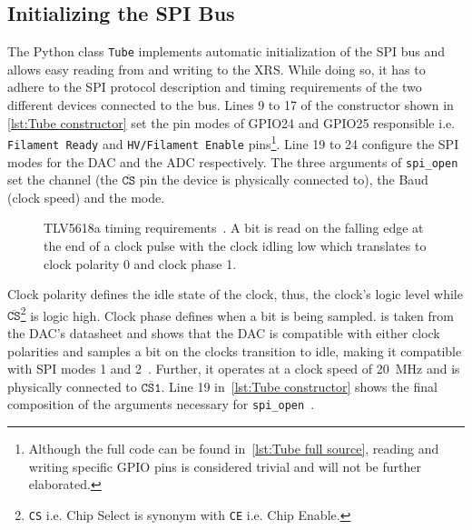         \subsection{Initializing the SPI Bus}\label{sec:init spi bus}
            The Python class \texttt{Tube} implements automatic initialization of the SPI bus and allows easy reading from and writing to the XRS.
            While doing so, it has to adhere to the SPI protocol description and timing requirements of the two different devices connected to the bus.
            Lines 9 to 17 of the constructor shown in \cref{lst:Tube constructor} set the pin modes of GPIO24 and GPIO25 responsible i.e. \texttt{Filament Ready} and \texttt{HV/Filament Enable} pins\footnote{Although the full code can be found in~\cref{lst:Tube full source}, reading and writing specific GPIO pins is considered trivial and will not be further elaborated.}.
            Line 19 to 24 configure the SPI modes for the DAC and the ADC respectively.
            The three arguments of \texttt{spi\_open} set the channel (the \(\overline{\texttt{CS}}\) pin the device is physically connected to), the Baud (clock speed) and the mode.

            \begin{figure}[h]
                \centering
                
                \caption[TLV5618a timing requirements]{TLV5618a timing requirements~\cite{Manual.DAC.TLV5618A}. A bit is read on the falling edge at the end of a clock pulse with the clock idling low which translates to clock polarity 0 and clock phase 1.}
                \label{fig:tlv5618a timing req}
            \end{figure}\par\medskip

            Clock polarity defines the idle state of the clock, thus, the clock's logic level while \(\overline{\texttt{CS}}\)\footnote{\texttt{CS} i.e. Chip Select is synonym with \texttt{CE} i.e. Chip Enable.} is logic high.
            Clock phase defines when a bit is being sampled.
             is taken from the DAC's datasheet and shows that the DAC is compatible with either clock polarities and samples a bit on the clocks transition to idle, making it compatible with SPI modes 1 and 2~\cite{Manual.IntroductionToSPIInterface.Dhaker.SPI}.
            Further, it operates at a clock speed of \qty{20}{\mega\hertz} and is physically connected to \(\overline{\texttt{CS1}}\).
            Line 19 in~\cref{lst:Tube constructor} shows the final composition of the arguments necessary for \texttt{spi\_open}~\cite{Manual.PigpioLibrary}.\par\medskip

